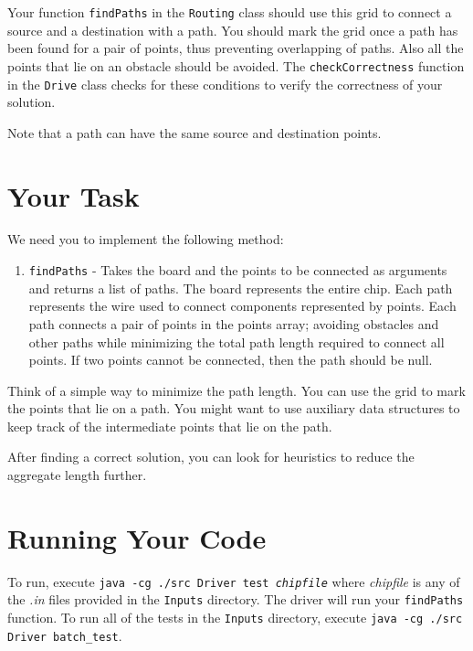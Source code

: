 \documentclass[12pt]{article}
\begin{document}
Your function \lstinline{findPaths} in the \lstinline{Routing} class
should use this grid to connect a source and a destination with a
path. You should mark the grid once a path has been found for a pair
of points, thus preventing overlapping of paths. Also all the points
that lie on an obstacle should be avoided. The
\lstinline{checkCorrectness} function in the \lstinline{Drive} class
checks for these conditions to verify the correctness of your
solution.


Note that a path can have the same source and destination points.

\section{Your Task}

We need you to implement the following method:
\begin{enumerate}
\item \lstinline{findPaths} - Takes the board and the points to be
  connected as arguments and returns a list of paths. The board
  represents the entire chip. Each path represents the wire used to
  connect components represented by points. Each path connects a pair
  of points in the points array; avoiding obstacles and other paths
  while minimizing the total path length required to connect all
  points. If two points cannot be connected, then the path should be
  null.
\end{enumerate}

Think of a simple way to minimize the path length. You can use the
grid to mark the points that lie on a path.  You might want to use
auxiliary data structures to keep track of the intermediate points
that lie on the path.

After finding a correct solution, you can look for heuristics to
reduce the aggregate length further.

\section{Running Your Code}

To run, execute \texttt{java -cg ./src Driver test \textit{chipfile}}
where \textit{chipfile} is any of the \textit{.in} files provided in
the \texttt{Inputs} directory. The driver will run your
\lstinline{findPaths} function. To run all of the tests in the
\texttt{Inputs} directory, execute \texttt{java -cg ./src Driver
  batch\_test}.
\end{document}
